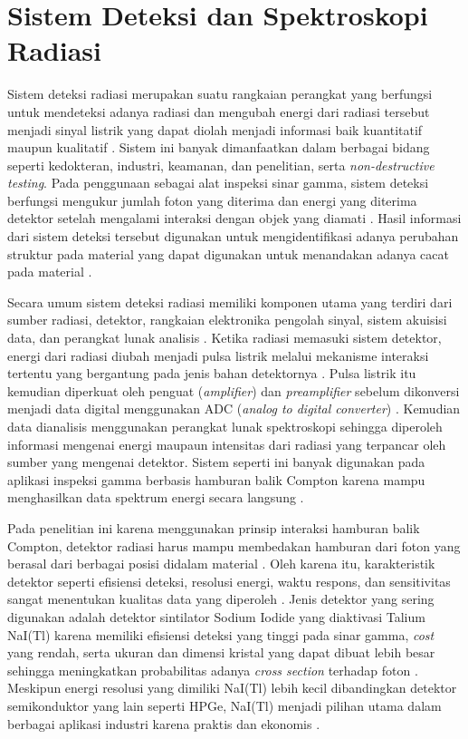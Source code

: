 \documentclass[12pt,a4paper]{report}
\begin{document}
\section{Sistem Deteksi dan Spektroskopi Radiasi}

Sistem deteksi radiasi merupakan suatu rangkaian perangkat yang berfungsi untuk mendeteksi adanya radiasi dan mengubah energi dari radiasi tersebut menjadi sinyal listrik yang dapat diolah menjadi informasi baik kuantitatif maupun kualitatif \cite{susanto2024kemajuan}. Sistem ini banyak dimanfaatkan dalam berbagai bidang seperti kedokteran, industri, keamanan, dan penelitian, serta \textit{non-destructive testing}. Pada penggunaan sebagai alat inspeksi 
sinar gamma, sistem deteksi berfungsi mengukur jumlah foton yang diterima dan energi yang diterima detektor setelah mengalami interaksi dengan objek yang diamati \cite{muttaqin2026rancang}. Hasil informasi dari sistem deteksi tersebut digunakan untuk mengidentifikasi adanya perubahan struktur pada material yang dapat digunakan untuk menandakan adanya cacat pada material \cite{irwansyah2019deteksi}.

Secara umum sistem deteksi radiasi memiliki komponen utama yang terdiri dari sumber radiasi, detektor, rangkaian elektronika pengolah sinyal, sistem akuisisi data, dan perangkat lunak analisis \cite{etim_digital}. Ketika radiasi memasuki sistem detektor, energi dari radiasi diubah menjadi pulsa listrik melalui mekanisme interaksi tertentu yang bergantung pada jenis bahan detektornya \cite{djokorayono2023gamma}. Pulsa listrik itu kemudian diperkuat oleh penguat (\textit{amplifier}) dan \textit{preamplifier} 
sebelum dikonversi menjadi data digital menggunakan ADC (\textit{analog to digital converter}) \cite{etim_digital}. Kemudian data dianalisis menggunakan perangkat lunak spektroskopi sehingga diperoleh informasi mengenai energi maupaun intensitas dari radiasi yang terpancar oleh sumber yang mengenai detektor. Sistem seperti ini banyak digunakan pada aplikasi inspeksi gamma berbasis hamburan balik Compton karena mampu menghasilkan data spektrum energi secara langsung \cite{zhang2023research}.

Pada penelitian ini karena menggunakan prinsip interaksi hamburan balik Compton, detektor radiasi harus mampu membedakan hamburan dari foton yang berasal dari berbagai posisi didalam material \cite{Yu2024}. Oleh karena itu, karakteristik detektor seperti efisiensi deteksi, resolusi energi, waktu respons, dan sensitivitas sangat menentukan kualitas data yang diperoleh \cite{Yu2024_arxiv}. Jenis detektor yang sering digunakan adalah detektor sintilator Sodium Iodide yang diaktivasi Talium NaI(Tl) karena 
memiliki efisiensi deteksi yang tinggi pada sinar gamma, \textit{cost} yang rendah, serta ukuran dan dimensi kristal yang dapat dibuat lebih besar sehingga meningkatkan probabilitas adanya \textit{cross section} terhadap foton \cite{Prihtiadi2018}. Meskipun energi resolusi yang dimiliki NaI(Tl) lebih kecil dibandingkan detektor semikonduktor yang lain seperti HPGe, NaI(Tl) menjadi pilihan utama dalam berbagai aplikasi industri karena praktis dan ekonomis \cite{Yu2024}.
\end{document}
